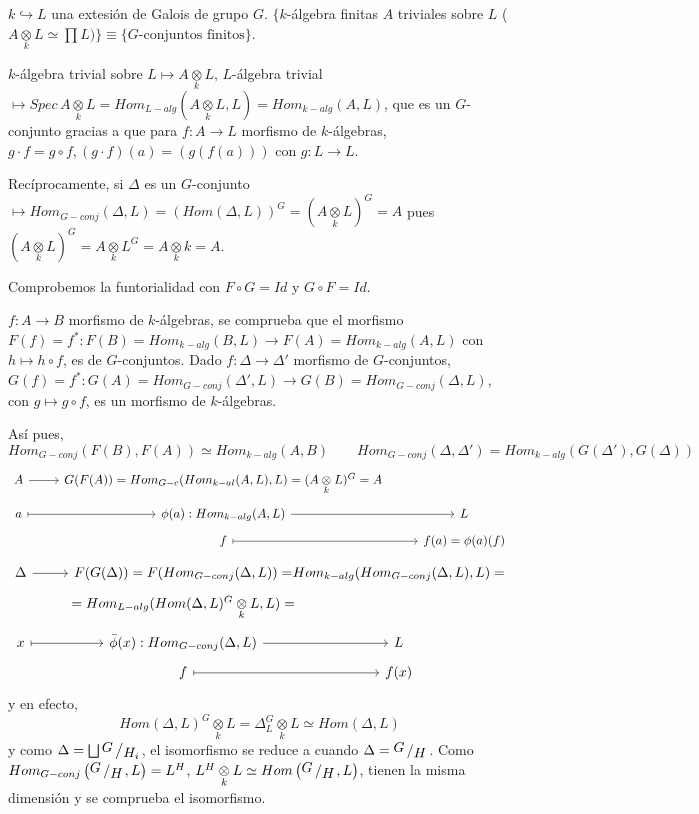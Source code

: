 \begin{teo}
 $k \hookrightarrow L$ una extesi\'on de Galois de grupo $G$. $\{k$-\'algebra finitas $A$ triviales sobre $L$ ($A\underset{k}{\otimes} L \simeq \prod L) \} \equiv \{G\text{-conjuntos finitos}\}$.

$k$-\'algebra trivial sobre $L \longmapsto A\underset{k}{\otimes} L, \, L$-\'algebra trivial $\longmapsto Spec\, A\underset{k}{\otimes} L = Hom_{L-alg}(A\underset{k}{\otimes} L , L) = Hom_{k-alg}(A, L)$, que es un $G$-conjunto gracias a que para $f: A \longrightarrow L$ morfismo de $k$-\'algebras, $g\cdot f = g \circ f, (g\cdot f)(a) =  (g(f(a)))$ con $g:L \to L$.

Rec\'iprocamente, si $\Delta$ es un $G$-conjunto $\longmapsto Hom_{G-conj}(\Delta,L) = (Hom(\Delta,L))^G = (A\underset{k}{\otimes} L )^G = A$ pues $(A\underset{k}{\otimes} L )^G = A\underset{k}{\otimes} L ^G = A\underset{k}{\otimes} k = A$.

Comprobemos la funtorialidad con $F\circ G = Id$ y $G\circ F = Id$. 

$f:A \to B$ morfismo de $k$-\'algebras, se comprueba que el morfismo $F(f)=f^*: F(B) = Hom_{k-alg}(B,L) \longrightarrow F(A) = Hom_{k-alg}(A,L)$ con $h \longmapsto h \circ f$, es de $G$-conjuntos. Dado $f:\Delta \longrightarrow \Delta'$ morfismo de $G$-conjuntos, $G(f) = f^*: G(A) = Hom_{G-conj}(\Delta', L)\longrightarrow G(B)=Hom_{G-conj}(\Delta, L)$, con $g \longmapsto g\circ f$, es un morfismo de $k$-\'algebras. 

As\'i pues, 
$$Hom_{G-conj}(F(B),F(A)) \simeq Hom_{k-alg}(A,B) \qquad Hom_{G-conj}(\Delta, \Delta') = Hom_{k-alg}(G(\Delta'), G(\Delta))$$
$$\bt A \rar & G(F(A)) = Hom_{G-c}(Hom_{k-al}(A,L),L) = (A\underset{k}{\otimes} L)^G = A \\[-5mm] a \rarmaps & \phi(a) : Hom_{k-alg}(A,L) \rar & L  \\[-5mm] & f \rarmaps & f(a) = \phi(a)(f)  \et $$
$$\bt \Delta \rar & F(G(\Delta)) = F(Hom_{G-conj}(\Delta,L)) = &[-12mm] Hom_{k-alg}(Hom_{G-conj}(\Delta,L),L) = \\[-5mm] & = Hom_{L-alg}(Hom(\Delta, L)^G \underset{k}{\otimes} L, L) =  \\[-5mm] x \rarmaps & \bar \phi(x) : Hom_{G-conj}(\Delta,L) \rar & L  \\[-5mm] & f \rarmaps & f(x)  \et$$
y en efecto, 
$$Hom(\Delta , L)^G \underset{k}{\otimes} L = \Delta_L^G \underset{k}{\otimes} L \simeq Hom(\Delta, L)$$
y como $\Delta = \bigsqcup \modulo{G}{H_i}$, el isomorfismo se reduce a cuando $\Delta = \modulo{G}{H}$. Como $Hom_{G-conj}\left(\modulo{G}{H},L\right) = L^H$, $L^H \underset{k}{\otimes} L \simeq Hom\left(\modulo{G}{H}, L\right)$, tienen la misma dimensi\'on y se comprueba el isomorfismo. 


\end{teo}
